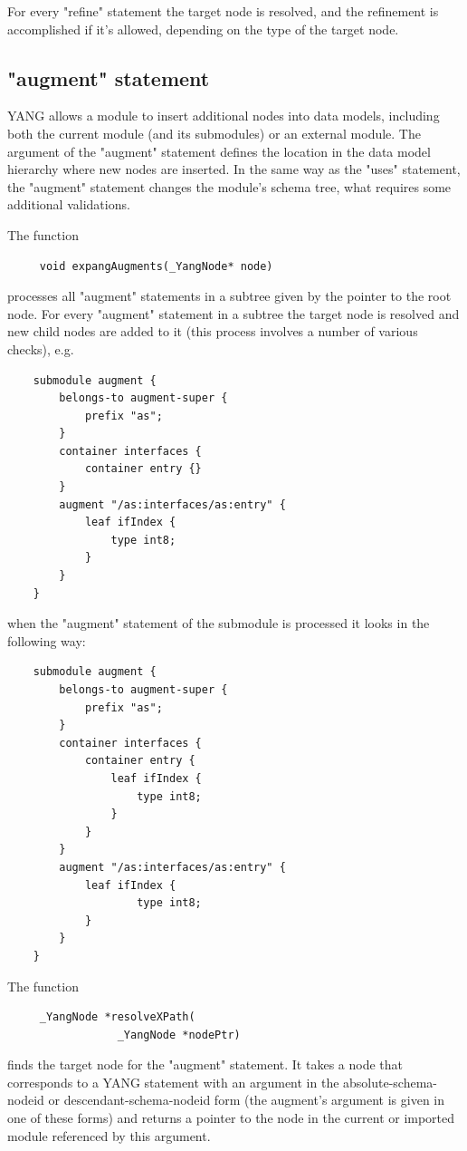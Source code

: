 \documentclass[conference]{IEEEtran}
\begin{document}
For every "refine" statement the target node is resolved, and the refinement is accomplished if it's allowed, depending on the type of the target node.


\subsection{"augment" statement}
\label{sec:augment}
YANG allows a module to insert additional nodes into data models, including both the current module (and its submodules) or an external module.
The argument of the "augment" statement defines the location in the data model hierarchy where new nodes are inserted.
In the same way as the "uses" statement, the "augment" statement changes the module's schema tree, what requires some additional validations.

The function
\small
\begin{verbatim}
     void expangAugments(_YangNode* node) 
\end{verbatim}
\normalsize
processes all "augment" statements in a subtree given by the pointer to the root node. For every "augment" statement in a subtree the target node is resolved
and new child nodes are added to it (this process involves a number of various checks), e.g.
\small
\begin{verbatim}
    submodule augment {
        belongs-to augment-super {
            prefix "as";
        }
        container interfaces {
            container entry {}
        }
        augment "/as:interfaces/as:entry" {
            leaf ifIndex {
                type int8;
            }
        }
    }
\end{verbatim}
\normalsize
when the "augment" statement of the submodule is processed it looks in the following way:
\small
\begin{verbatim}
    submodule augment {
        belongs-to augment-super {
            prefix "as";
        }
        container interfaces {
            container entry {
                leaf ifIndex {
                    type int8;
                }			
            }
        }
        augment "/as:interfaces/as:entry" {
            leaf ifIndex {
                    type int8;
            }
        }
    }
\end{verbatim}
\normalsize

The function
\small
\begin{verbatim}
     _YangNode *resolveXPath(
                 _YangNode *nodePtr)
\end{verbatim}
\normalsize
finds the target node for the "augment" statement. It takes a node that corresponds to a YANG statement with an argument in the absolute-schema-nodeid or descendant-schema-nodeid form (the augment's argument is given in one of these forms)  
and returns a pointer to the node in the current or imported module referenced by this argument.
\end{document}
